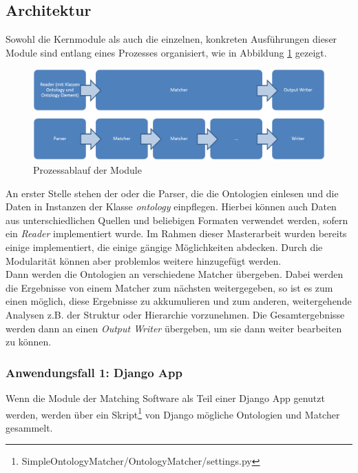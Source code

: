 		\subsection{Architektur}
		Sowohl die Kernmodule als auch die einzelnen, konkreten Ausführungen dieser
		Module sind entlang eines Prozesses organisiert, wie in Abbildung \ref{fig2}
		gezeigt.
		\begin{figure}[ht]
		\centering
		\includegraphics[width=1.0\textwidth]{pics/Module-overview.png}
		\caption{Prozessablauf der Module}
		\label{fig2}
		\end{figure}
		An erster Stelle stehen der oder die Parser, die die Ontologien einlesen und
		die Daten in Instanzen der Klasse \textit{ontology} einpflegen. Hierbei können
		auch Daten aus unterschiedlichen Quellen und beliebigen Formaten verwendet
		werden, sofern ein \textit{Reader} implementiert wurde. Im Rahmen dieser
		Masterarbeit wurden bereits einige implementiert, die einige gängige
		Möglichkeiten abdecken. Durch die Modularität können aber problemlos weitere
		hinzugefügt werden.\\
		Dann werden die Ontologien an verschiedene Matcher übergeben. Dabei werden
		die Ergebnisse von einem Matcher zum nächsten weitergegeben, so ist es zum
		einen möglich, diese Ergebnisse zu akkumulieren und zum
		anderen, weitergehende Analysen z.B. der Struktur oder Hierarchie vorzunehmen.
		Die Gesamtergebnisse werden dann an einen \textit{Output Writer} übergeben, um
		sie dann weiter bearbeiten zu können.\\
		
		
		\subsubsection{Anwendungsfall 1: Django App}
		Wenn die Module der Matching Software als Teil einer Django App genutzt
		werden, werden über ein
		Skript\footnote{SimpleOntologyMatcher/OntologyMatcher/settings.py} von Django
		mögliche Ontologien und Matcher gesammelt.
		
